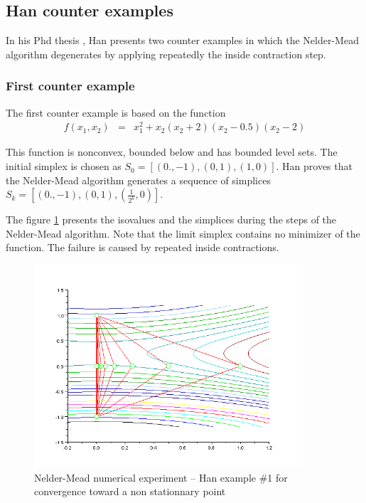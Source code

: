 \subsection{Han counter examples}

In his Phd thesis \cite{Han2000}, Han presents two counter examples
in which the Nelder-Mead algorithm degenerates by applying repeatedly
the inside contraction step.

\subsubsection{First counter example}

The first counter example is based on the function 
\begin{eqnarray}
\label{han-function1}
f(x_1,x_2) &=& x_1^2 + x_2 ( x_2 + 2 ) ( x_2 - 0.5 ) ( x_2 - 2 )
\end{eqnarray}

This function is nonconvex, bounded below and has bounded level 
sets. The initial simplex is chosen as $S_0 = [(0.,-1),(0,1),(1,0)]$.
Han proves that the Nelder-Mead algorithm generates a sequence of simplices
$S_k = [(0.,-1),(0,1),(\frac{1}{2^k},0)]$.

The figure \ref{fig-nm-numexp-han1} presents the isovalues and the 
simplices during the steps of the Nelder-Mead algorithm.
Note that the limit simplex contains no minimizer of the function.
The failure is caused by repeated inside contractions.

\begin{figure}
\begin{center}
\includegraphics[width=10cm]{han1-history-simplex.png}
\end{center}
\caption{Nelder-Mead numerical experiment -- Han example \#1 for convergence toward
a non stationnary point}
\label{fig-nm-numexp-han1}
\end{figure}

